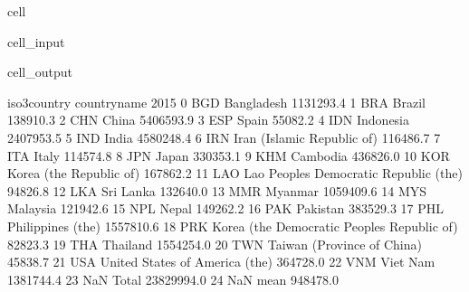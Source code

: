 \documentclass[letterpaper,10pt,english]{jupyterBook}
\begin{document}
\begin{sphinxuseclass}{cell}\begin{sphinxVerbatimInput}

\begin{sphinxuseclass}{cell_input}
\begin{sphinxVerbatim}[commandchars=\\\{\}]
\end{sphinxVerbatim}

\end{sphinxuseclass}\end{sphinxVerbatimInput}
\begin{sphinxVerbatimOutput}

\begin{sphinxuseclass}{cell_output}
\begin{sphinxVerbatim}[commandchars=\\\{\}]
   iso3\PYGZus{}country                                 country\PYGZus{}name        2015  \PYGZbs{}
0           BGD                                   Bangladesh   1131293.4   
1           BRA                                       Brazil    138910.3   
2           CHN                                        China   5406593.9   
3           ESP                                        Spain     55082.2   
4           IDN                                    Indonesia   2407953.5   
5           IND                                        India   4580248.4   
6           IRN                   Iran (Islamic Republic of)    116486.7   
7           ITA                                        Italy    114574.8   
8           JPN                                        Japan    330353.1   
9           KHM                                     Cambodia    436826.0   
10          KOR                      Korea (the Republic of)    167862.2   
11          LAO       Lao People\PYGZsq{}s Democratic Republic (the)     94826.8   
12          LKA                                    Sri Lanka    132640.0   
13          MMR                                      Myanmar   1059409.6   
14          MYS                                     Malaysia    121942.6   
15          NPL                                        Nepal    149262.2   
16          PAK                                     Pakistan    383529.3   
17          PHL                            Philippines (the)   1557810.6   
18          PRK  Korea (the Democratic People\PYGZsq{}s Republic of)     82823.3   
19          THA                                     Thailand   1554254.0   
20          TWN                   Taiwan (Province of China)     45838.7   
21          USA               United States of America (the)    364728.0   
22          VNM                                     Viet Nam   1381744.4   
23          NaN                                        Total  23829994.0   
24          NaN                                         mean    948478.0   


\end{sphinxVerbatim}
\end{sphinxuseclass}
\end{sphinxVerbatimOutput}
\end{sphinxuseclass}
\end{document}
